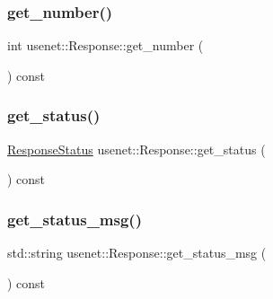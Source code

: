 \hypertarget{class_nntp_client_1_1_response_a6fcb329845b34c07b7664563d3fddc56}{}\label{class_nntp_client_1_1_response_a6fcb329845b34c07b7664563d3fddc56} 
\subsubsection{\texorpdfstring{get\+\_\+number()}{get\_number()}}
{\footnotesize\ttfamily int usenet\+::\+Response\+::get\+\_\+number (\begin{DoxyParamCaption}{ }\end{DoxyParamCaption}) const}

\hypertarget{class_nntp_client_1_1_response_a91f3ff944af660439f1e4d1f0fcce6ec}{}\label{class_nntp_client_1_1_response_a91f3ff944af660439f1e4d1f0fcce6ec} 
\subsubsection{\texorpdfstring{get\+\_\+status()}{get\_status()}}
{\footnotesize\ttfamily \hyperlink{namespace_nntp_client_a920c73a4038b2a2c307245b909b43203}{Response\+Status} usenet\+::\+Response\+::get\+\_\+status (\begin{DoxyParamCaption}{ }\end{DoxyParamCaption}) const}

\hypertarget{class_nntp_client_1_1_response_a5edade79d654037339ce413e45e8e9c0}{}\label{class_nntp_client_1_1_response_a5edade79d654037339ce413e45e8e9c0} 
\subsubsection{\texorpdfstring{get\+\_\+status\+\_\+msg()}{get\_status\_msg()}}
{\footnotesize\ttfamily std\+::string usenet\+::\+Response\+::get\+\_\+status\+\_\+msg (\begin{DoxyParamCaption}{ }\end{DoxyParamCaption}) const}

